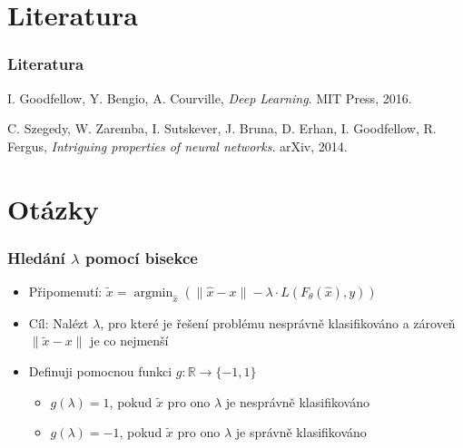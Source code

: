 \documentclass[czech]{beamer}
\begin{document}
\section*{Literatura}

\begin{frame}
    \frametitle{Literatura}
    \begin{thebibliography}{1}
        I. Goodfellow, Y. Bengio, A. Courville,
        \emph{Deep Learning}. MIT Press, 2016.


         C. Szegedy, W. Zaremba, I. Sutskever, J. Bruna, D. Erhan, I. Goodfellow, R. Fergus,
        \emph{Intriguing properties of neural networks}.
        arXiv, 2014.

    \end{thebibliography}
\end{frame}

\section{Otázky}

\begin{frame}
    \frametitle{Hledání $\lambda$ pomocí bisekce}
    \begin{itemize}
        \item Připomenutí: $\tilde{x}  = \operatorname{argmin}_{\hat{x}} \left(\|\hat{x} - x\|
        - \lambda \cdot L(F_{\theta}(\hat{x}), y) \right)$
        \item Cíl: Nalézt $\lambda$, pro které je řešení problému nesprávně klasifikováno a zároveň $\|\tilde{x} - x\|$ je co nejmenší
        \item Definuji pomocnou funkci $g: \mathbb{R} \rightarrow \{-1, 1\}$
        \begin{itemize}
            \item $g(\lambda) = 1$, pokud $\tilde{x}$ pro ono $\lambda$ je nesprávně klasifikováno
            \item $g(\lambda) = -1$, pokud $\tilde{x}$ pro ono $\lambda$ je správně klasifikováno
        \end{itemize}
    \end{itemize}
\end{frame}
\end{document}
